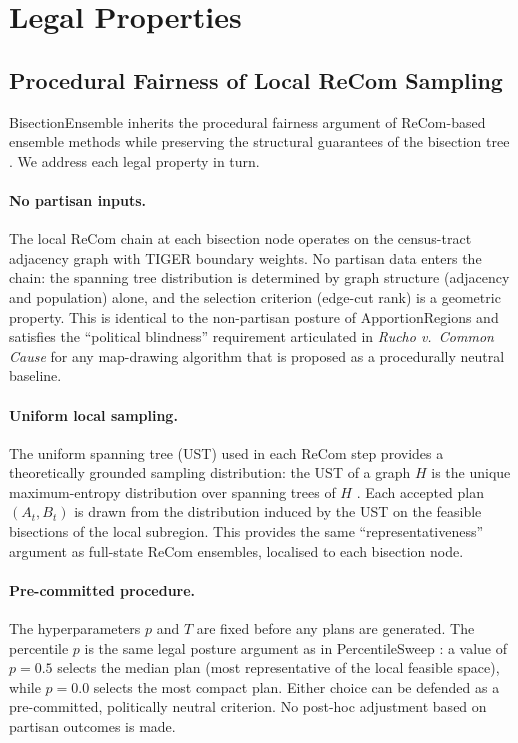 \section{Legal Properties}
\label{sec:legal}

\subsection{Procedural Fairness of Local ReCom Sampling}
\label{sec:legal:procedural}

BisectionEnsemble inherits the procedural fairness argument of ReCom-based
ensemble methods \citep{deford2021recombination, duchin2021report} while
preserving the structural guarantees of the bisection tree
\citep{dellaLibera2026apportion}. We address each legal property in turn.

\paragraph{No partisan inputs.}
The local ReCom chain at each bisection node operates on the census-tract
adjacency graph with TIGER boundary weights. No partisan data enters the
chain: the spanning tree distribution is determined by graph structure
(adjacency and population) alone, and the selection criterion (edge-cut rank)
is a geometric property. This is identical to the non-partisan posture of
ApportionRegions \citep{dellaLibera2026apportion} and satisfies the
``political blindness'' requirement articulated in \emph{Rucho v.\ Common Cause}
\citep{rucho2019} for any map-drawing algorithm that is proposed as a
procedurally neutral baseline.

\paragraph{Uniform local sampling.}
The uniform spanning tree (UST) used in each ReCom step provides a
theoretically grounded sampling distribution: the UST of a graph $H$ is the
unique maximum-entropy distribution over spanning trees of $H$
\citep{aldous1990random, wilson1996generating}. Each accepted plan
$(A_t, B_t)$ is drawn from the distribution induced by the UST on the
feasible bisections of the local subregion. This provides the same
``representativeness'' argument as full-state ReCom ensembles, localised to
each bisection node.

\paragraph{Pre-committed procedure.}
The hyperparameters $p$ and $T$ are fixed before any plans are generated.
The percentile $p$ is the same legal posture argument as in PercentileSweep
\citep{dellaLibera2026percentilesweep}: a value of $p = 0.5$ selects the
median plan (most representative of the local feasible space), while $p = 0.0$
selects the most compact plan. Either choice can be defended as a pre-committed,
politically neutral criterion. No post-hoc adjustment based on partisan outcomes
is made.

